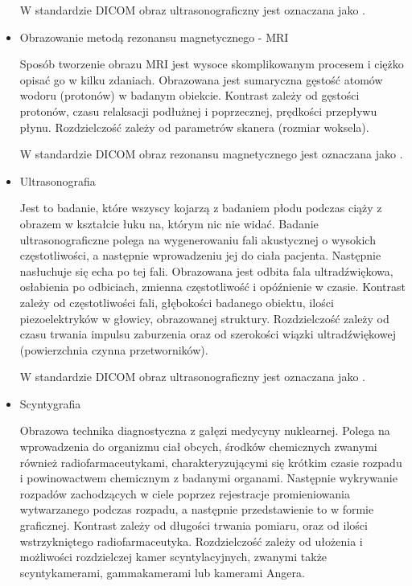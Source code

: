 \begin{itemize}
    W standardzie DICOM obraz ultrasonograficzny jest oznaczana jako .

    \item Obrazowanie metodą rezonansu magnetycznego - MRI

    Sposób tworzenie obrazu MRI jest wysoce skomplikowanym procesem i ciężko opisać go w kilku zdaniach.
    Obrazowana jest sumaryczna gęstość atomów wodoru (protonów) w badanym obiekcie.
    Kontrast zależy od gęstości protonów, czasu relaksacji podłużnej i poprzecznej, prędkości przepływu płynu.
    Rozdzielczość zależy od parametrów skanera (rozmiar woksela).
    
    W standardzie DICOM obraz rezonansu magnetycznego jest oznaczana jako .
    
    \item Ultrasonografia
    
    Jest to badanie, które wszyscy kojarzą z badaniem płodu podczas ciąży z obrazem w kształcie łuku na, którym nic nie widać.
    Badanie ultrasonograficzne polega na wygenerowaniu fali akustycznej o wysokich częstotliwości, a następnie wprowadzeniu jej do ciała pacjenta.
    Następnie nasłuchuje się echa po tej fali.
    Obrazowana jest odbita fala ultradźwiękowa, osłabienia po odbiciach, zmienna częstotliwość i opóźnienie w czasie.
    Kontrast zależy od częstotliwości fali, głębokości badanego obiektu, ilości piezoelektryków w głowicy, obrazowanej struktury.
    Rozdzielczość zależy od czasu trwania impulsu zaburzenia oraz od szerokości wiązki ultradźwiękowej (powierzchnia czynna przetworników).

    W standardzie DICOM obraz ultrasonograficzny jest oznaczana jako .

    \item Scyntygrafia
    
    Obrazowa technika diagnostyczna z gałęzi medycyny nuklearnej.
    Polega na wprowadzenia do organizmu ciał obcych, środków chemicznych zwanymi również radiofarmaceutykami, charakteryzującymi się krótkim czasie rozpadu i powinowactwem chemicznym z badanymi organami.
    Następnie wykrywanie rozpadów zachodzących w ciele poprzez rejestracje promieniowania wytwarzanego podczas rozpadu, a następnie przedstawienie to w formie graficznej.
    Kontrast zależy od długości trwania pomiaru, oraz od ilości wstrzykniętego radiofarmaceutyka.
    Rozdzielczość zależy od ułożenia i możliwości rozdzielczej kamer scyntylacyjnych, zwanymi także scyntykamerami, gammakamerami lub kamerami Angera.


\end{itemize}
